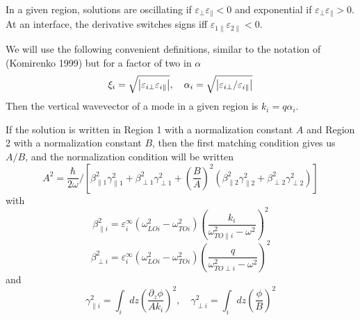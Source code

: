 \documentclass{article}
\begin{document}
In a given region, solutions are oscillating if $\varepsilon_\perp\varepsilon_\parallel<0$ and exponential if $\varepsilon_\perp\varepsilon_\parallel>0$.  At an interface, the derivative switches signs iff $\varepsilon_{1\parallel}\varepsilon_{2\parallel}<0$.

We  will use the following convenient definitions, similar to the notation of (Komirenko 1999) but for a factor of two in $\alpha$
\begin{equation}
  \xi_{i}=\sqrt{\abs{\varepsilon_{i\perp}\varepsilon_{i\parallel}}},\quad
  \alpha_i=\sqrt{\abs{\varepsilon_{i\perp}/\varepsilon_{i\parallel}}}
\end{equation}
Then the vertical wavevector of a mode in a given region is $k_i=q\alpha_i$.

If the solution is written in Region 1 with a normalization constant $A$ and Region 2 with a normalization constant $B$, then the first matching condition gives us $A/B$, and the normalization condition will be written
\begin{equation}
  A^2=\frac{\hbar}{2\omega}\big/\left[ \beta^2_{\parallel 1}\gamma_{\parallel 1}^2+\beta^2_{\perp 1}\gamma_{\perp 1}^2 + \left(\frac{B}{A}\right)^2\left(\beta^2_{\parallel 2}\gamma_{\parallel 2}^2+\beta^2_{\perp 2}\gamma_{\perp 2}^2 \right) \right]
\end{equation}
with 
\begin{equation}
  \beta_{\parallel i}^2=\varepsilon^\infty_i\left( \omega_{LOi}^2-\omega_{TOi}^2 \right)\left( \frac{k_i}{\omega_{TO\parallel i}^2-\omega^2} \right)^2
\end{equation}
\begin{equation}
  \beta_{\perp     i}^2=\varepsilon^\infty_i\left( \omega_{LOi}^2-\omega_{TOi}^2 \right)\left( \frac{  q}{\omega_{TO\perp i}^2-\omega^2} \right)^2
\end{equation}
and 
\begin{equation}
  \gamma_{\parallel i}^2=\int_{i} dz \left(\frac{\partial_z \phi}{A k_i}\right)^2, \quad
  \gamma_{\perp i}^2=\int_{i} dz \left(\frac{\phi}{B}\right)^2
\end{equation}
\end{document}
